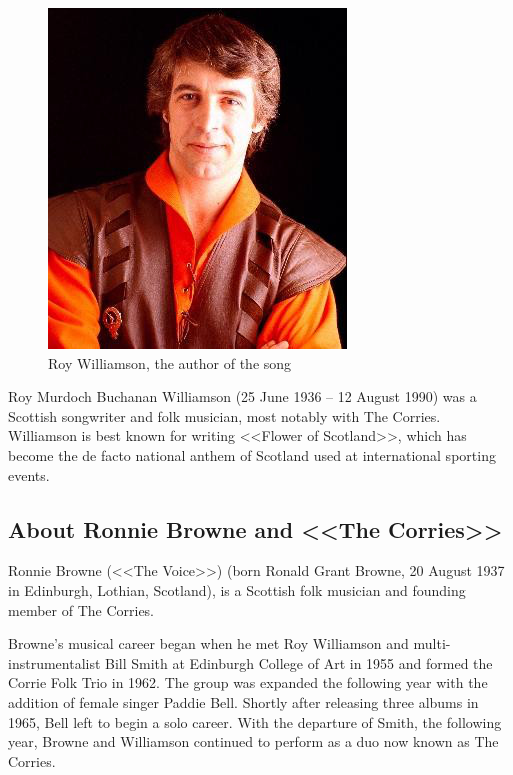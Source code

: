 \documentclass[a4paper,12pt]{article}
\begin{document}
\begin{figure}
	\includegraphics[width=\linewidth]{roy1}
	\caption{Roy Williamson, the author of the song}
\end{figure} Roy Murdoch Buchanan Williamson (25 June 1936 – 12 August 1990) was a Scottish songwriter and folk musician, most notably with The Corries. Williamson is best known for writing <<Flower of Scotland>>, which has become the de facto national anthem of Scotland used at international sporting events.

\subsection{About Ronnie Browne and <<The Corries>>}

Ronnie Browne (<<The Voice>>) (born Ronald Grant Browne, 20 August 1937 in Edinburgh, Lothian, Scotland), is a Scottish folk musician and founding member of The Corries.

Browne's musical career began when he met Roy Williamson and multi-instrumentalist Bill Smith at Edinburgh College of Art in 1955 and formed the Corrie Folk Trio in 1962. The group was expanded the following year with the addition of female singer Paddie Bell. Shortly after releasing three albums in 1965, Bell left to begin a solo career. With the departure of Smith, the following year, Browne and Williamson continued to perform as a duo now known as The Corries.

\end{document}
